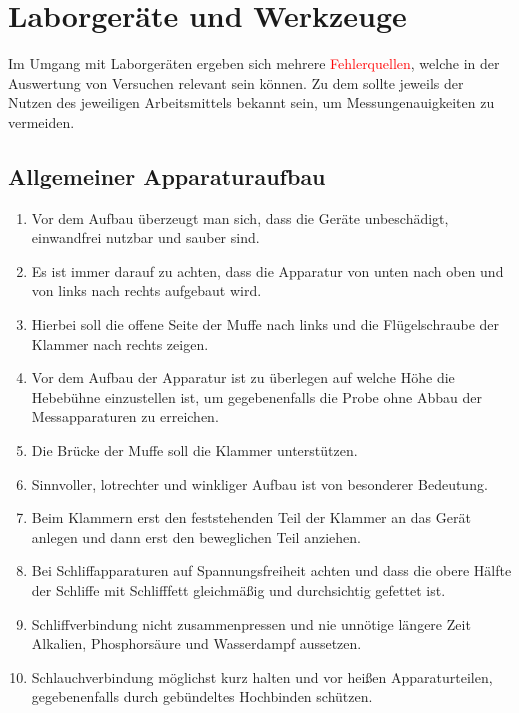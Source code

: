 \section{Laborgeräte und Werkzeuge}
Im Umgang mit Laborgeräten ergeben sich mehrere \textcolor{red}{Fehlerquellen}, welche in der Auswertung von Versuchen relevant sein können. Zu dem sollte jeweils der Nutzen des jeweiligen Arbeitsmittels bekannt sein, um Messungenauigkeiten zu vermeiden.



\subsection*{Allgemeiner Apparaturaufbau}
\begin{enumerate}
	\item Vor dem Aufbau überzeugt man sich, dass die Geräte unbeschädigt, einwandfrei nutzbar und sauber sind.
	\item Es ist immer darauf zu achten, dass die Apparatur von unten nach oben und von links nach rechts aufgebaut wird.
	\item Hierbei soll die offene Seite der Muffe nach links und die Flügelschraube der Klammer nach rechts zeigen.
	\item Vor dem Aufbau der Apparatur ist zu überlegen auf welche Höhe die Hebebühne einzustellen ist, um gegebenenfalls die Probe ohne Abbau der Messapparaturen zu erreichen.
	\item Die Brücke der Muffe soll die Klammer unterstützen.
	\item Sinnvoller, lotrechter und winkliger Aufbau ist von besonderer Bedeutung.
	\item Beim Klammern erst den feststehenden Teil der Klammer an das Gerät anlegen und dann erst den beweglichen Teil anziehen.
	\item Bei Schliffapparaturen auf Spannungsfreiheit achten und dass die obere Hälfte der Schliffe mit Schlifffett gleichmäßig und durchsichtig gefettet ist.
	\item Schliffverbindung nicht zusammenpressen und nie unnötige längere Zeit Alkalien, Phosphorsäure und Wasserdampf aussetzen.
	\item Schlauchverbindung möglichst kurz halten und vor heißen Apparaturteilen, gegebenenfalls durch gebündeltes Hochbinden schützen.
\end{enumerate}

